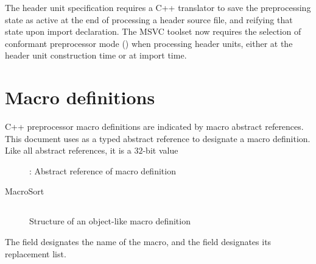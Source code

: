 \label{sec:ifc-preprocessing}


The header unit specification requires a C++ translator to save the preprocessing
 state as active at the end of processing a header source file, and reifying that 
 state upon import declaration.  The MSVC toolset now requires the selection 
 of conformant preprocessor mode () when processing header units, 
 either at the header unit construction time or at import time.

\section{Macro definitions}
\label{sec:ifc-macro-defs}

C++ preprocessor macro definitions are indicated by macro abstract references.
This document uses  as a typed abstract reference
to designate a macro definition.  Like all abstract references, it is a $32$-bit value
\begin{figure}[htbp]
    \centering
    \caption{: Abstract reference of macro definition}
    \label{fig:ifc-macro-index}
\end{figure}

\begin{SortEnum}{MacroSort}
\end{SortEnum}

\subsection{}
\label{sec:ifc:MacroSort:ObjectLike}

\begin{figure}[H]
    \centering
    \caption{Structure of an object-like macro definition}
    \label{fig:ifc-object-like-macro-structure}
\end{figure}

The field  designates the name of the macro, and the field  designates its replacement list.



\subsection{}
\label{sec:ifc:MacroSort:FunctionLike}

